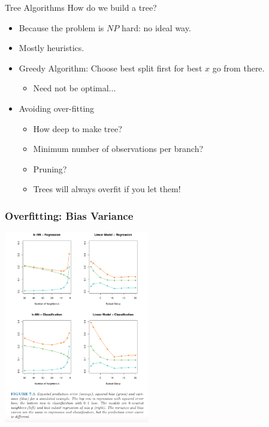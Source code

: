\documentclass[xcolor=pdftex,dvipsnames,table,mathserif]{beamer}
\begin{document}
\begin{frame}{Tree Algorithms}
How do we build a tree?
\begin{itemize}
\item Because the problem is $NP$ hard: no ideal way.
\item Mostly heuristics.
\item Greedy Algorithm: Choose best split first for best $x$ go from there.
\begin{itemize}
\item Need not be optimal...
\end{itemize}
\item Avoiding \alert{over-fitting}
\begin{itemize}
\item How deep to make tree?
\item Minimum number of observations per branch?
\item Pruning?
\item Trees will always overfit if you let them!
\end{itemize}
\end{itemize}
\end{frame}


\begin{frame}
\frametitle{Overfitting: Bias Variance}
\includegraphics[width=2.5in]{./resources/bias-variance.png}
\end{frame}
\end{document}
